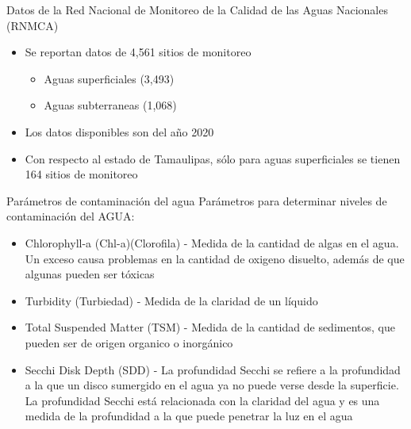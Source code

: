 \documentclass[aspectratio=169,compress]{beamer}
\begin{document}
\begin{frame}{Datos de la Red Nacional de Monitoreo de la Calidad de las Aguas Nacionales (RNMCA)}
\begin {itemize}
\item Se reportan datos de 4,561 sitios de monitoreo
\begin{itemize}
\item Aguas superficiales (3,493)
\item Aguas subterraneas (1,068)
\end{itemize}
\item Los datos disponibles son del año 2020
\item Con respecto al estado de Tamaulipas, sólo para aguas superficiales se tienen 164 sitios de monitoreo
\end{itemize}
\end{frame}

\begin{frame}{Parámetros de contaminación del agua}
Parámetros para determinar niveles de contaminación del AGUA:
\begin{itemize}
\item Chlorophyll-a (Chl-a)(Clorofila) - Medida de la cantidad de algas en el agua. Un exceso causa problemas en la cantidad de oxigeno disuelto,  además de que algunas pueden ser tóxicas
\item Turbidity (Turbiedad) - Medida de la claridad de un líquido
\item Total Suspended Matter (TSM) - Medida de la cantidad de sedimentos, que pueden ser de origen organico o inorgánico 
\item Secchi Disk Depth (SDD) - La profundidad Secchi se refiere a la profundidad a la que un disco sumergido en el agua ya no puede verse desde la superficie. La profundidad Secchi está relacionada con la claridad del agua y es una medida de la profundidad a la que puede penetrar la luz en el agua
\end{itemize}
\end{frame}
\end{document}
